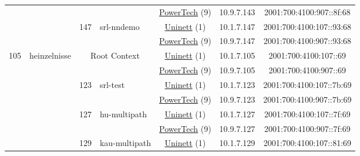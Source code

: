 \begin{small}
\begin{center}
\begin{longtable}{|c|c|c|c|c|c|c|c|}
  &  &  &  & \multicolumn{2}{|c|}{\tiny{\href{http://www.powertech.no}{PowerTech} (9)}} & \tiny{10.9.7.143} & \tiny{2001:700:4100:907::8f:68} \\* \cline{3-3}\cline{4-4}\cline{5-5}\cline{6-6}\cline{7-7}\cline{8-8}
  &  & \multirow{2}{*}{\tiny{147}} & \multicolumn{1}{|l|}{\multirow{2}{*}{\tiny{srl-nndemo}}} & \multicolumn{2}{|c|}{\tiny{\href{https://www.uninett.no}{Uninett} (1)}} & \tiny{10.1.7.147} & \tiny{2001:700:4100:107::93:68} \\* \cline{5-5}\cline{6-6}\cline{7-7}\cline{8-8}
  &  &  &  & \multicolumn{2}{|c|}{\tiny{\href{http://www.powertech.no}{PowerTech} (9)}} & \tiny{10.9.7.147} & \tiny{2001:700:4100:907::93:68} \\ \hline
 \multirow{12}{*}{\tiny{105}} & \multicolumn{1}{|l|}{\multirow{12}{*}{\tiny{heinzelnisse}}} & \multicolumn{2}{|c|}{\multirow{2}{*}{\tiny{Root Context}}} & \multicolumn{2}{|c|}{\tiny{\href{https://www.uninett.no}{Uninett} (1)}} & \tiny{10.1.7.105} & \tiny{2001:700:4100:107::69} \\* \cline{5-5}\cline{6-6}\cline{7-7}\cline{8-8}
  &  & \multicolumn{2}{|c|}{} & \multicolumn{2}{|c|}{\tiny{\href{http://www.powertech.no}{PowerTech} (9)}} & \tiny{10.9.7.105} & \tiny{2001:700:4100:907::69} \\* \cline{3-3}\cline{4-4}\cline{5-5}\cline{6-6}\cline{7-7}\cline{8-8}
  &  & \multirow{2}{*}{\tiny{123}} & \multicolumn{1}{|l|}{\multirow{2}{*}{\tiny{srl-test}}} & \multicolumn{2}{|c|}{\tiny{\href{https://www.uninett.no}{Uninett} (1)}} & \tiny{10.1.7.123} & \tiny{2001:700:4100:107::7b:69} \\* \cline{5-5}\cline{6-6}\cline{7-7}\cline{8-8}
  &  &  &  & \multicolumn{2}{|c|}{\tiny{\href{http://www.powertech.no}{PowerTech} (9)}} & \tiny{10.9.7.123} & \tiny{2001:700:4100:907::7b:69} \\* \cline{3-3}\cline{4-4}\cline{5-5}\cline{6-6}\cline{7-7}\cline{8-8}
  &  & \multirow{2}{*}{\tiny{127}} & \multicolumn{1}{|l|}{\multirow{2}{*}{\tiny{hu-multipath}}} & \multicolumn{2}{|c|}{\tiny{\href{https://www.uninett.no}{Uninett} (1)}} & \tiny{10.1.7.127} & \tiny{2001:700:4100:107::7f:69} \\* \cline{5-5}\cline{6-6}\cline{7-7}\cline{8-8}
  &  &  &  & \multicolumn{2}{|c|}{\tiny{\href{http://www.powertech.no}{PowerTech} (9)}} & \tiny{10.9.7.127} & \tiny{2001:700:4100:907::7f:69} \\* \cline{3-3}\cline{4-4}\cline{5-5}\cline{6-6}\cline{7-7}\cline{8-8}
  &  & \multirow{2}{*}{\tiny{129}} & \multicolumn{1}{|l|}{\multirow{2}{*}{\tiny{kau-multipath}}} & \multicolumn{2}{|c|}{\tiny{\href{https://www.uninett.no}{Uninett} (1)}} & \tiny{10.1.7.129} & \tiny{2001:700:4100:107::81:69} \\* \cline{5-5}\cline{6-6}\cline{7-7}\cline{8-8}

\end{longtable}
\end{center}
\end{small}
